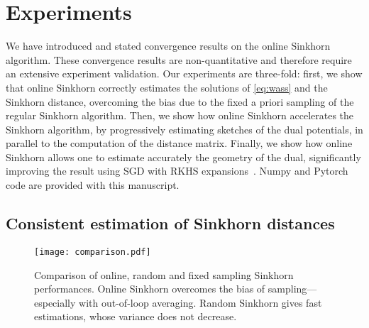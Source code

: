 \section{Experiments}\label{sec:exps}

We have introduced and stated convergence results on the online Sinkhorn
algorithm. These convergence results are non-quantitative and therefore require
an extensive experiment validation. Our experiments are three-fold: first, we
show that online Sinkhorn correctly estimates the solutions of
\eqref{eq:wass} and the Sinkhorn distance, overcoming the bias due to the fixed
a priori sampling of the regular Sinkhorn algorithm. Then, we show how online
Sinkhorn accelerates the Sinkhorn algorithm, by progressively estimating
sketches of the dual potentials, in parallel to the computation of the distance
matrix. Finally, we show how online Sinkhorn allows one to estimate accurately
the geometry of the dual, significantly improving the result using SGD with RKHS
expansions~\citep{2016-genevay-nips}. Numpy and Pytorch code are provided with
this manuscript.

\subsection{Consistent estimation of Sinkhorn distances}\label{sec:exp1}

\begin{figure}[t]
    \centering
    \texttt{[image: comparison.pdf]}

    \vspace{-1em}

    \caption{Comparison of online, random and fixed sampling Sinkhorn performances. Online Sinkhorn overcomes the bias of sampling---especially with out-of-loop averaging. Random Sinkhorn gives fast estimations, whose variance does not decrease.}
    \label{fig:convergence}
\end{figure}



